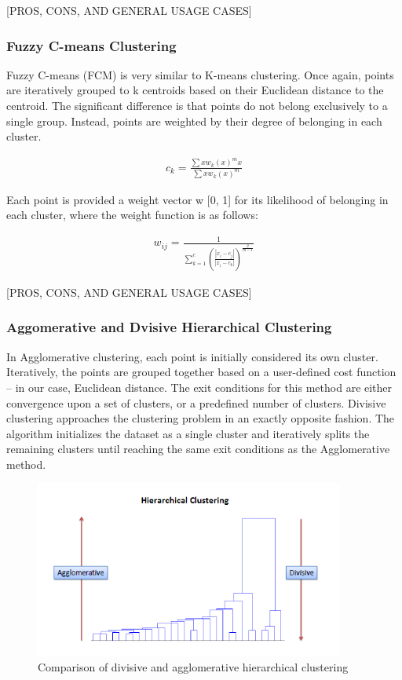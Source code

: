\documentclass[12pt]{drexelthesis}
\begin{document}
[PROS, CONS, AND GENERAL USAGE CASES]

\subsubsection{Fuzzy C-means Clustering}

Fuzzy C-means (FCM) is very similar to K-means clustering. Once again, points are iteratively grouped to k centroids based on their Euclidean distance to the centroid. The significant difference is that points do not belong exclusively to a single group. Instead, points are weighted by their degree of belonging in each cluster.

\begin{gather*}
	c_{k} = \frac{\sum{x}w_{k}(x)^{m}x}{\sum{x}w_{k}(x)^{m}}
\end{gather*}

Each point is provided a weight vector w [0, 1] for its likelihood of belonging in each cluster, where the weight function is as follows:

\begin{gather*}
	w_{ij} = \frac{1}{\sum_{k=1}^{c}(\frac{|x_{i}-c_{j}|}{|x_{i}-c_{k}|})^{\frac{2}{m-1}}}
\end{gather*}

[PROS, CONS, AND GENERAL USAGE CASES]

\subsubsection{Aggomerative and Dvisive Hierarchical Clustering}
In Agglomerative clustering, each point is initially considered its own cluster. Iteratively, the points are grouped together based on a user-defined cost function – in our case, Euclidean distance. The exit conditions for this method are either convergence upon a set of clusters, or a predefined number of clusters.
Divisive clustering approaches the clustering problem in an exactly opposite fashion. The algorithm initializes the dataset as a single cluster and iteratively splits the remaining clusters until reaching the same exit conditions as the Agglomerative method.


\begin{figure}
\centering
\includegraphics[width=4in]{divisiveAgglomerative.png}
\caption[Comparison of divisive and agglomerative clustering methods]{Comparison of divisive and agglomerative hierarchical clustering}
\end{figure}
\end{document}

